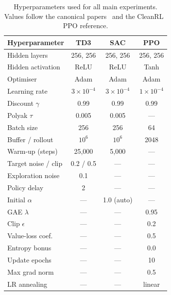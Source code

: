 \documentclass[letterpaper]{article}
\begin{document}
\begin{table}[t]
  \centering
  \small
  \begin{tabular}{lccc}
    \hline
    Hyperparameter       & TD3       & SAC       & PPO      \\
    \hline
    Hidden layers        & 256, 256  & 256, 256  & 256, 256 \\
    Hidden activation    & ReLU      & ReLU      & Tanh     \\
    Optimiser            & Adam      & Adam      & Adam     \\
    Learning rate        & $3{\times}10^{-4}$ & $3{\times}10^{-4}$ & $1{\times}10^{-4}$ \\
    Discount $\gamma$    & 0.99      & 0.99      & 0.99     \\
    Polyak $\tau$        & 0.005     & 0.005     & ---      \\
    Batch size           & 256       & 256       & 64       \\
    Buffer / rollout     & $10^{6}$  & $10^{6}$  & 2048     \\
    Warm-up (steps)      & 25{,}000  & 5{,}000   & ---      \\
    Target noise / clip  & 0.2 / 0.5 & ---       & ---      \\
    Exploration noise    & 0.1       & ---       & ---      \\
    Policy delay         & 2         & ---       & ---      \\
    Initial $\alpha$     & ---       & 1.0 (auto)& ---      \\
    GAE $\lambda$        & ---       & ---       & 0.95     \\
    Clip $\epsilon$      & ---       & ---       & 0.2      \\
    Value-loss coef.\    & ---       & ---       & 0.5      \\
    Entropy bonus        & ---       & ---       & 0.0      \\
    Update epochs        & ---       & ---       & 10       \\
    Max grad norm        & ---       & ---       & 0.5      \\
    LR annealing         & ---       & ---       & linear   \\
    \hline
  \end{tabular}
  \caption{Hyperparameters used for all main experiments. Values follow
  the canonical papers~\citep{fujimoto2018td3,haarnoja2018sac,schulman2017ppo}
  and the CleanRL~\citep{huang2022cleanrl} PPO reference.}
  \label{tab:hparams}
\end{table}
\end{document}
